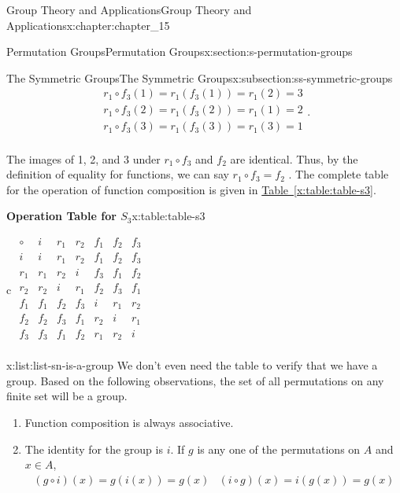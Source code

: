 \documentclass[oneside,10pt,]{book}
\newcommand{\tabularfont}{\relax}
\newcommand{\xreffont}{\relax}
\numberwithin{equation}{section}
\newcommand{\hrulethick} {\noalign{\hrule height 0.11em}}
\begin{document}
\begin{chapterptx}{Group Theory and Applications}{}{Group Theory and Applications}{}{}{x:chapter:chapter_15}
\begin{sectionptx}{Permutation Groups}{}{Permutation Groups}{}{}{x:section:s-permutation-groups}
\begin{subsectionptx}{The Symmetric Groups}{}{The Symmetric Groups}{}{}{x:subsection:ss-symmetric-groups}
\begin{equation*}
\begin{array}{c}
r_1\circ f_3(1) =r_1\left(f_3(1)\right)= r_1(2)=3 \\
r_1\circ f_3(2)=r_1\left(f_3(2)\right)= r_1(1)= 2 \\
r_1\circ f_3(3)=r_1\left(f_3(3)\right)= r_1(3)= 1\\
\end{array}\text{.}
\end{equation*}
%
\par
The images of 1, 2, and 3 under \(r_1\circ f_3\) and \(f_2\) are identical. Thus, by the definition of equality for functions, we can say \(r_1\circ f_3=f_2\) . The complete table for the operation of function composition is given in \hyperref[x:table:table-s3]{Table~{\xreffont\ref{x:table:table-s3}}}.%
\begin{tableptx}{\textbf{Operation Table for \(S_3\)}}{x:table:table-s3}{}%
\centering
{\tabularfont%
\begin{tabular}{c}\hrulethick
\(\begin{array}{c|cccccc}
\circ &   i &r_1 & r_2 & f_1 & f_2 & f_3 \\
\hline
i &  i &r_1 & r_2 & f_1 & f_2 & f_3 \\
r_1 &  r_1 &r_2 & i & f_3 & f_1 & f_2 \\
r_2 &  r_2 &i & r_1 & f_2 & f_3 & f_1 \\
f_1 & f_1 & f_2 & f_3 & i & r_1 & r_2 \\
f_2 & f_2 &f_3 & f_1 & r_2 & i & r_1 \\
f_3 & f_3 & f_1 & f_2 & r_1 & r_2 & i \\
\end{array}\)
\end{tabular}
}%
\end{tableptx}%
\begin{listptx}{\textbf{}}{x:list:list-sn-is-a-group}{}%
We don't even need the table to verify that we have a group. Based on the following observations, the set of all permutations on any finite set will be a group.%
%
\begin{enumerate}[label=(\arabic*)]
\item{}Function composition is always associative.%
\item{}The identity for the group is \(i\). If \(g\) is any one of the permutations on \(A\) and  \(x\in A\),%
\begin{equation*}
\begin{array}{lr}
(g\circ i)(x) = g(i(x)) = g(x) &(i\circ g)(x) = i(g(x)) = g(x)\\
\end{array}

\end{equation*}
\end{enumerate}
\end{listptx}
\end{subsectionptx}
\end{sectionptx}
\end{chapterptx}
\end{document}
